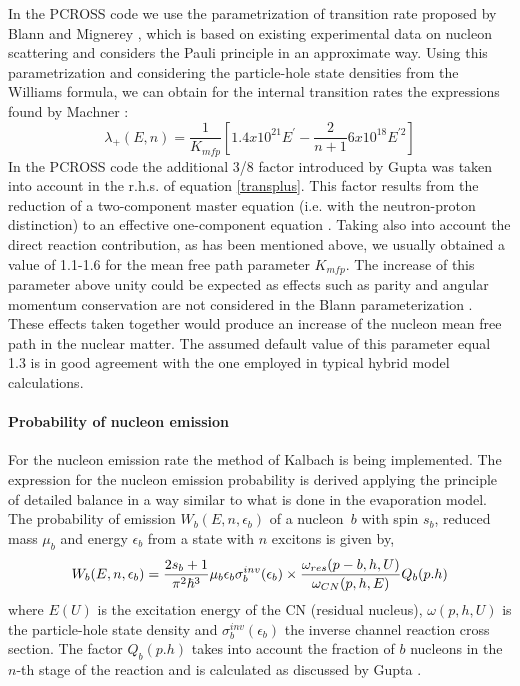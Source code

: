 In the PCROSS code we use the parametrization of transition rate proposed by
Blann and Mignerey \cite{blmi72}, which is based on existing experimental
data on nucleon scattering and considers the Pauli principle in an
approximate way. Using this parametrization and considering the
particle-hole state densities from the Williams formula, we can obtain for
the internal transition rates the expressions found by Machner \cite{ma81}:
\begin{equation}
\lambda _{+}(E,n)=\frac{1}{K_{mfp}}\left[ 1.4x10^{21}E^{\prime }-\frac{2}{n+1%
}6x10^{18}E^{\prime 2}\right]  \label{transplus}
\end{equation}%
In the PCROSS code the additional 3/8 factor introduced by Gupta \cite{gu81}
was taken into account in the r.h.s. of equation \ref{transplus}. This
factor results from the reduction of a two-component master equation (i.e.
with the neutron-proton distinction) to an effective one-component equation
\cite{gu81}. Taking also into account the direct reaction contribution, as
has been mentioned above, we usually obtained a value of 1.1-1.6 for the
mean free path parameter $K_{mfp}$. The increase of this parameter above
unity could be expected as effects such as parity and angular momentum
conservation are not considered in the Blann parameterization \cite{blmi72}.
These effects taken together would produce an increase of the nucleon mean
free path in the nuclear matter. The assumed default value of this parameter
equal 1.3 is in good agreement with the one employed in typical hybrid model
calculations.

\paragraph{Probability of nucleon emission}

For the nucleon emission rate the method of Kalbach \cite{clbl71,cl72,ka77}
is being implemented. The expression for the nucleon emission probability is
derived applying the principle of detailed balance in a way similar to what
is done in the evaporation model. The probability of emission $%
W_{b}(E,n,\epsilon _{b})$ of a nucleon\textit{\ }$b$ with spin $s_{b}$,
reduced mass $\mu _{b}$ and energy $\epsilon _{b}$ from a state with $n$
excitons is given by,
\begin{equation}
W_{b}(E,n,\epsilon _{b})=\frac{2s_{b}+1}{\pi ^{2}\hbar ^{3}}\mu _{b}\epsilon
_{b}\sigma _{b}^{inv}(\epsilon _{b})\times   \notag \\
\frac{\omega _{res}(p-b,h,U)}{\omega _{CN}(p,h,E)}Q_{b}(p.h)
\end{equation}%
where $E(U)$ is the excitation energy of the CN (residual nucleus), $\omega
(p,h,U)$ is the particle-hole state density and $\sigma _{b}^{inv}(\epsilon
_{b})$ the inverse channel reaction cross section. The factor $Q_{b}(p.h)$
takes into account the fraction of $b$ nucleons in the $n$-th stage of the
reaction and is calculated as discussed by Gupta \cite{gu81}.

